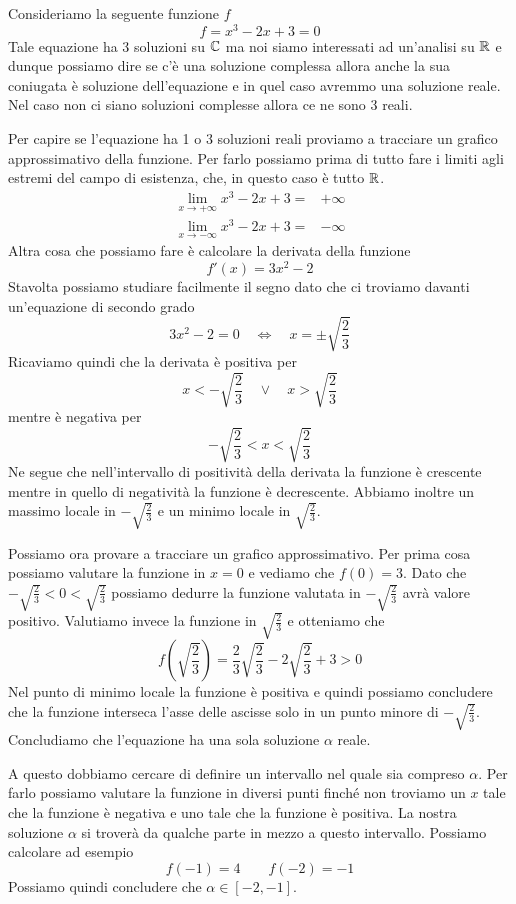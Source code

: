 \begin{example}
	Consideriamo la seguente funzione $f$
	\[ f = x^3 - 2x + 3 = 0 \]
	Tale equazione ha 3 soluzioni su $\mathbb{C}$ ma noi siamo interessati ad un'analisi su $\mathbb{R}$ e dunque possiamo dire
	se c'è una soluzione complessa allora anche la sua coniugata è soluzione dell'equazione e in quel caso
	avremmo una soluzione reale. Nel caso non ci siano soluzioni complesse allora ce ne sono 3 reali.

	Per capire se l'equazione ha 1 o 3 soluzioni reali proviamo a tracciare un grafico approssimativo della
	funzione. Per farlo possiamo prima di tutto fare i limiti agli estremi del campo di esistenza, che, in
	questo caso è tutto $\mathbb{R}$.
	\begin{align*}
		\lim_{x \to +\infty} x^3 - 2x + 3 = & +\infty \\
		\lim_{x \to -\infty} x^3 - 2x + 3 = & -\infty
	\end{align*}
	Altra cosa che possiamo fare è calcolare la derivata della funzione
	\[ f'(x) = 3x^2 - 2 \]
	Stavolta possiamo studiare facilmente il segno dato che ci troviamo davanti un'equazione di secondo grado
	\[ 3x^2 - 2 = 0 \quad \Leftrightarrow \quad x = \pm \sqrt{\frac{2}{3}} \]
	Ricaviamo quindi che la derivata è positiva per
	\[ x < -\sqrt{\frac{2}{3}} \quad \vee \quad x > \sqrt{\frac{2}{3}} \]
	mentre è negativa per
	\[ -\sqrt{\frac{2}{3}} < x < \sqrt{\frac{2}{3}} \]
	Ne segue che nell'intervallo di positività della derivata la funzione è crescente mentre in quello di
	negatività la funzione è decrescente. Abbiamo inoltre un massimo locale in $-\sqrt{\frac{2}{3}}$ e un
	minimo locale in $\sqrt{\frac{2}{3}}$.

	Possiamo ora provare a tracciare un grafico approssimativo. Per prima cosa possiamo valutare la funzione in
	$x = 0$ e vediamo che $f(0) = 3$. Dato che $-\sqrt{\frac{2}{3}} < 0 < \sqrt{\frac{2}{3}}$ possiamo dedurre
	la funzione valutata in $-\sqrt{\frac{2}{3}}$ avrà valore positivo. Valutiamo invece la funzione in
	$\sqrt{\frac{2}{3}}$ e otteniamo che
	\[ f \left( \sqrt{\frac{2}{3}} \right) = \frac{2}{3} \sqrt{\frac{2}{3}} - 2 \sqrt{\frac{2}{3}} + 3 > 0 \]
	Nel punto di minimo locale la funzione è positiva e quindi possiamo concludere che la funzione interseca
	l'asse delle ascisse solo in un punto minore di $-\sqrt{\frac{2}{3}}$. Concludiamo che l'equazione ha una
	sola soluzione $\alpha$ reale.

	A questo dobbiamo cercare di definire un intervallo nel quale sia compreso $\alpha$. Per farlo possiamo
	valutare la funzione in diversi punti finché non troviamo un $x$ tale che la funzione è negativa e uno
	tale che la funzione è positiva. La nostra soluzione $\alpha$ si troverà da qualche parte in mezzo a questo
	intervallo. Possiamo calcolare ad esempio
	\[ f(-1) = 4 \quad \quad f(-2) = -1 \]
	Possiamo quindi concludere che $\alpha \in [-2, -1]$.
\end{example}

